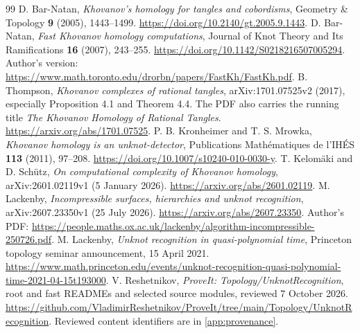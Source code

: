 \documentclass[11pt,letterpaper]{article}
\theoremstyle{definition}
\begin{document}
\begin{thebibliography}{99}
 D. Bar-Natan, \emph{Khovanov's homology for tangles and cobordisms}, Geometry \& Topology \textbf{9} (2005), 1443--1499. \url{https://doi.org/10.2140/gt.2005.9.1443}.
 D. Bar-Natan, \emph{Fast Khovanov homology computations}, Journal of Knot Theory and Its Ramifications \textbf{16} (2007), 243--255. \url{https://doi.org/10.1142/S0218216507005294}. Author's version: \url{https://www.math.toronto.edu/drorbn/papers/FastKh/FastKh.pdf}.
 B. Thompson, \emph{Khovanov complexes of rational tangles}, arXiv:1701.07525v2 (2017), especially Proposition 4.1 and Theorem 4.4. The PDF also carries the running title \emph{The Khovanov Homology of Rational Tangles}. \url{https://arxiv.org/abs/1701.07525}.
 P. B. Kronheimer and T. S. Mrowka, \emph{Khovanov homology is an unknot-detector}, Publications Math\'ematiques de l'IH\'ES \textbf{113} (2011), 97--208. \url{https://doi.org/10.1007/s10240-010-0030-y}.
 T. Kelom\"aki and D. Sch\"utz, \emph{On computational complexity of Khovanov homology}, arXiv:2601.02119v1 (5 January 2026). \url{https://arxiv.org/abs/2601.02119}.
 M. Lackenby, \emph{Incompressible surfaces, hierarchies and unknot recognition}, arXiv:2607.23350v1 (25 July 2026). \url{https://arxiv.org/abs/2607.23350}. Author's PDF: \url{https://people.maths.ox.ac.uk/lackenby/algorithm-incompressible-250726.pdf}.
 M. Lackenby, \emph{Unknot recognition in quasi-polynomial time}, Princeton topology seminar announcement, 15 April 2021. \url{https://www.math.princeton.edu/events/unknot-recognition-quasi-polynomial-time-2021-04-15t193000}.
 V. Reshetnikov, \emph{ProveIt: Topology/UnknotRecognition}, root and fast READMEs and selected source modules, reviewed 7 October 2026. \url{https://github.com/VladimirReshetnikov/ProveIt/tree/main/Topology/UnknotRecognition}. Reviewed content identifiers are in \cref{app:provenance}.
\end{thebibliography}
\end{document}
